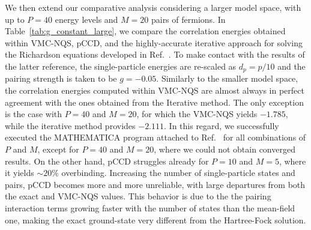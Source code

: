 \documentclass[aps,pre,floatfix,showpacs,twocolumn, preprintnumbers]{revtex4-1}
\begin{document}
We then extend our comparative analysis considering a larger model space, with up to $P=40$ energy levels and $M=20$ pairs of fermions. In Table~\ref{tab:g_constant_large}, we compare the correlation energies obtained within VMC-NQS, pCCD, and the highly-accurate iterative approach for solving the Richardson equations developed in Ref.~\cite{Guan:2022CoPhC}. To make contact with the results of the latter reference, the single-particle energies are re-scaled as $d_p = p / 10$ and the pairing strength is taken to be $g=-0.05$. Similarly to the smaller model space, the correlation energies computed within VMC-NQS are almost always in perfect agreement with the ones obtained from the Iterative method. The only exception is the case with $P=40$ and $M=20$, for which the VMC-NQS yields $-1.785$, while the iterative method provides $-2.111$. In this regard, we successfully executed the MATHEMATICA program attached to Ref.~\cite{Guan:2022CoPhC} for all combinations of $P$ and $M$, except for $P=40$ and $M=20$, where we could not obtain converged results. On the other hand, pCCD struggles already for $P=10$ and $M=5$, where it yields $\sim 20\%$ overbinding. Increasing the number of single-particle states and pairs, pCCD becomes more and more unreliable, with large departures from both the exact and VMC-NQS values. This behavior is due to the the pairing interaction terms growing faster with the number of states than the mean-field one, making the exact ground-state very different from the Hartree-Fock solution.
%
\end{document}
